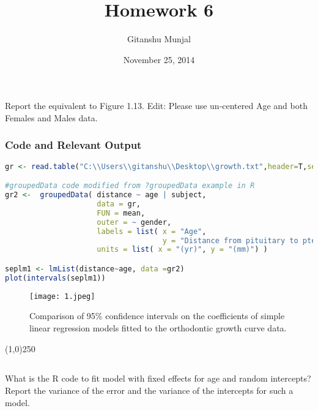 \documentclass[a4paper]{article}
\title{Homework 6}
\author{Gitanshu Munjal}
\date{November 25, 2014}
\begin{document}
\maketitle

\section{}

\subsection{}Report the equivalent to Figure 1.13. Edit:  Please use un-centered Age and both Females and Males data.


\subsubsection{Code and Relevant Output}
\begin{lstlisting}[language=R]
gr <- read.table("C:\\Users\\gitanshu\\Desktop\\growth.txt",header=T,sep=",")

#groupedData code modified from ?groupedData example in R
gr2 <-  groupedData( distance ~ age | subject,
                     data = gr,
                     FUN = mean,
                     outer = ~ gender,
                     labels = list( x = "Age",
                                    y = "Distance from pituitary to pterygomaxillary fissure" ),
                     units = list( x = "(yr)", y = "(mm)") )

seplm1 <- lmList(distance~age, data =gr2)
plot(intervals(seplm1))
\end{lstlisting}
\begin{figure}[H]
\centering
\texttt{[image: 1.jpeg]}\\
\caption{\label{fig:1} Comparison of 95\% confidence intervals on the coefficients of
simple linear regression models fitted to the orthodontic growth curve
data.}
\end{figure}
\begin{center}
\line(1,0){250}
\end{center}
\pagebreak




\subsection{}What is the R code to fit model with fixed effects for age and random intercepts? Report the variance of the error and the variance of the intercepts for such a model. 
\end{document}
